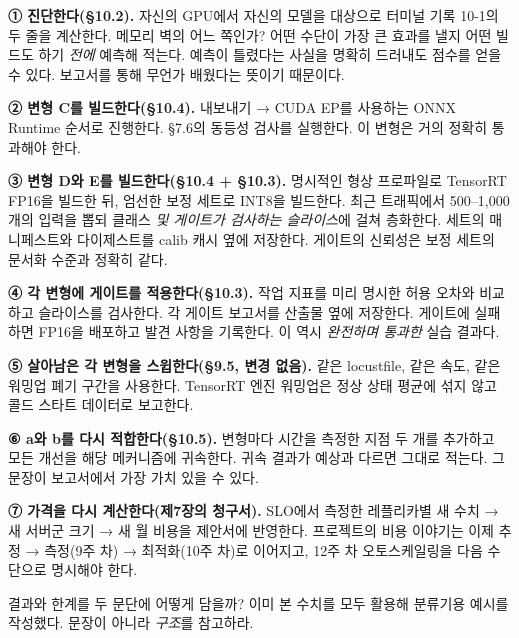 \begin{tbbitemize}
  \item \textbf{① 진단한다(§10.2).} 자신의 GPU에서 자신의 모델을 대상으로 터미널 기록 10-1의 두 줄을 계산한다. 메모리 벽의 어느 쪽인가? 어떤 수단이 가장 큰 효과를 낼지 어떤 빌드도 하기 \textit{전에} 예측해 적는다. 예측이 틀렸다는 사실을 명확히 드러내도 점수를 얻을 수 있다. 보고서를 통해 무언가 배웠다는 뜻이기 때문이다.
  \item \textbf{② 변형 C를 빌드한다(§10.4).} 내보내기 → CUDA EP를 사용하는 ONNX Runtime 순서로 진행한다. §7.6의 동등성 검사를 실행한다. 이 변형은 거의 정확히 통과해야 한다.
  \item \textbf{③ 변형 D와 E를 빌드한다(§10.4 + §10.3).} 명시적인 형상 프로파일로 TensorRT FP16을 빌드한 뒤, 엄선한 보정 세트로 INT8을 빌드한다. 최근 트래픽에서 500–1,000개의 입력을 뽑되 클래스 \textit{및 게이트가 검사하는 슬라이스}에 걸쳐 층화한다. 세트의 매니페스트와 다이제스트를 calib 캐시 옆에 저장한다. 게이트의 신뢰성은 보정 세트의 문서화 수준과 정확히 같다.
  \item \textbf{④ 각 변형에 게이트를 적용한다(§10.3).} 작업 지표를 미리 명시한 허용 오차와 비교하고 슬라이스를 검사한다. 각 게이트 보고서를 산출물 옆에 저장한다. 게이트에 실패하면 FP16을 배포하고 발견 사항을 기록한다. 이 역시 \textit{완전하며 통과한} 실습 결과다.
  \item \textbf{⑤ 살아남은 각 변형을 스윕한다(§9.5, 변경 없음).} 같은 locustfile, 같은 속도, 같은 워밍업 폐기 구간을 사용한다. TensorRT 엔진 워밍업은 정상 상태 평균에 섞지 않고 콜드 스타트 데이터로 보고한다.
  \item \textbf{⑥ a와 b를 다시 적합한다(§10.5).} 변형마다 시간을 측정한 지점 두 개를 추가하고 모든 개선을 해당 메커니즘에 귀속한다. 귀속 결과가 예상과 다르면 그대로 적는다. 그 문장이 보고서에서 가장 가치 있을 수 있다.
  \item \textbf{⑦ 가격을 다시 계산한다(제7장의 청구서).} SLO에서 측정한 레플리카별 새 수치 → 새 서버군 크기 → 새 월 비용을 제안서에 반영한다. 프로젝트의 비용 이야기는 이제 추정 → 측정(9주 차) → 최적화(10주 차)로 이어지고, 12주 차 오토스케일링을 다음 수단으로 명시해야 한다.
\end{tbbitemize}

결과와 한계를 두 문단에 어떻게 담을까? 이미 본 수치를 모두 활용해 분류기용 예시를 작성했다. 문장이 아니라 \textit{구조}를 참고하라.

